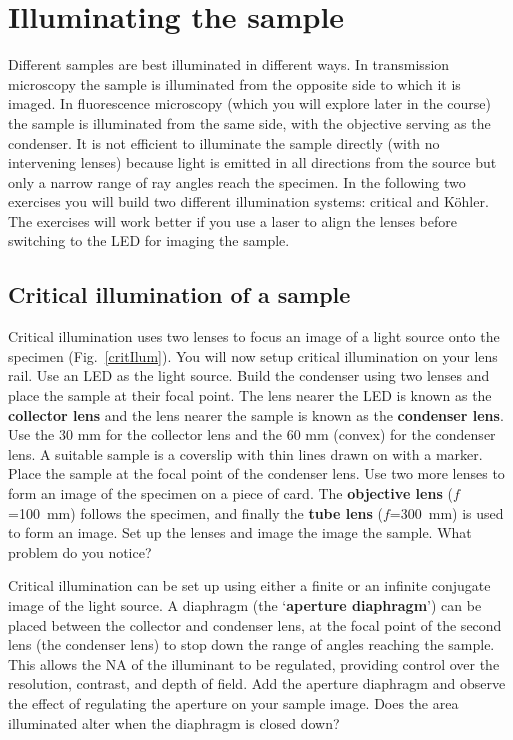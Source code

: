 \documentclass[a4paper]{report}
\begin{document}
\clearpage
\section{Illuminating the sample}
Different samples are best illuminated in different ways. In transmission
microscopy the sample is illuminated from the opposite side to which
it is imaged. In fluorescence microscopy (which you will explore later
in the course) the sample is illuminated from the same side, with the
objective serving as the condenser. It is not efficient to illuminate
the sample directly (with no intervening lenses) because light is
emitted in all directions from the source but only a narrow range of
ray angles reach the specimen. In the following two exercises you will
build two different illumination systems: critical and K\"{o}hler. The
exercises will work better if you use a laser to align the lenses
before switching to the LED for imaging the sample. 


\subsection{Critical illumination of a sample}
Critical illumination uses two lenses to focus an image of a light
source onto the specimen (Fig.~\ref{critIlum}). You will now setup
critical illumination on your lens rail. Use an LED as the light
source. Build the condenser using two lenses and place the sample at
their focal point. The lens nearer the LED is known as the
\textbf{collector lens} and the lens nearer the sample is known as the
\textbf{condenser lens}. Use the 30 mm for the collector lens and the
60 mm (convex) for the condenser lens. A suitable sample is a
coverslip with thin lines drawn on with a marker. Place the sample at
the focal point of the condenser lens. Use two more lenses to form an
image of the specimen on a piece of card. The \textbf{objective lens}
($f$=100~mm) follows the specimen, and finally the \textbf{tube lens}
($f$=300~mm) is used to form an image. Set up the lenses and image the
image the sample. What problem do you notice?

Critical illumination can be set up using either a finite or an
infinite conjugate image of the light source. A diaphragm (the
`\textbf{aperture diaphragm}') can be placed between the collector and
condenser lens, at the focal point of the second lens (the condenser
lens) to stop down the range of angles reaching the sample. This
allows the NA of the illuminant to be regulated, providing control
over the resolution, contrast, and depth of field. Add the aperture
diaphragm and observe the effect of regulating the aperture on your
sample image. Does the area illuminated alter when the diaphragm is
closed down?
\end{document}
